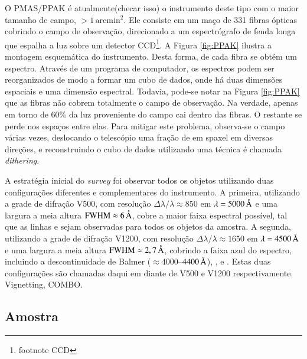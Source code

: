 O PMAS/PPAK é atualmente\fixme(checar isso) o instrumento deste tipo com o maior
tamanho de campo, $>1\,\mathrm{arcmin}^2$. Ele consiste em um maço de 331 fibras
ópticas cobrindo o campo de observação, direcionado a um espectrógrafo de fenda
longa que espalha a luz sobre um detector CCD\footnote{\TODO footnote CCD}. A
Figura \ref{fig:PPAK} ilustra a montagem esquemática do instrumento.
Desta forma, de cada fibra se obtém um espectro. Através de um programa de
computador, os espectros podem ser reorganizados de modo a formar um cubo de
dados, onde há duas dimensões espaciais e uma dimensão espectral. Todavia,
pode-se notar na Figura \ref{fig:PPAK} que as fibras não cobrem totalmente o
campo de observação. Na verdade, apenas em torno de 60\% da luz proveniente do
campo cai dentro das fibras. O restante se perde nos espaços entre elas. Para
mitigar este problema, observa-se o campo várias vezes, deslocando o telescópio
uma fração de {em spaxel} em diversas direções, e reconstruindo o cubo de dados
utilizando uma técnica é chamada {\em dithering}.

A estratégia inicial do {\em survey} foi observar todos os objetos utilizando
duas configurações diferentes e complementares do instrumento. A primeira,
utilizando a grade de difração V500, com resolução $\Delta \lambda / \lambda
\approx 850$ em $\lambda = 5000\,\text{\normalfont\AA}$ e uma largura a meia altura
$\mathrm{FWHM} \approx 6\,\text{\normalfont\AA}$, cobre a maior faixa espectral possível,
tal que as linhas \OII e \SII sejam observadas para todos os objetos da amostra.
A segunda, utilizando a grade de difração V1200, com resolução $\Delta \lambda /
\lambda \approx 1650$ em $\lambda = 4500\,\text{\normalfont\AA}$ e uma largura a meia altura
$\mathrm{FWHM} \approx 2,7\,\text{\normalfont\AA}$, cobrindo a faixa azul do espectro,
incluindo a descontinuidade de Balmer ($\approx 4000$--$4400\,\text{\normalfont\AA}$),
\Hdelta, \Hgamma e . Estas duas configurações são chamadas daqui em
diante de V500 e V1200 respectivamente. \TODO Vignetting, COMBO.

\subsection{Amostra}

